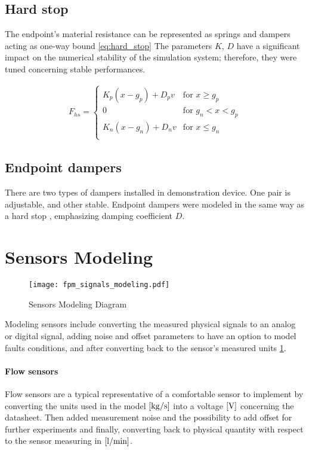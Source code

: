 \subsection{Hard stop}
The endpoint's material resistance can be represented as springs and
dampers acting as one-way bound \ref{eq:hard_stop}
The parameters $K$, $D$  have a significant impact on the numerical stability
of the simulation system; therefore, they were tuned concerning stable
performances.

\begin{align}
    F_{hs} =
    \begin{cases}
        K_p(x-g_p) + D_pv & \text{for } x \ge g_p \\
        0 & \text{for } g_n < x < g_p \\
        K_n(x-g_n) + D_nv & \text{for } x \le g_n \\
    \end{cases}
    \label{eq:hard_stop}
\end{align}


\subsection{Endpoint dampers}
There are two types of dampers installed in demonstration device. One pair
is adjustable, and other stable.  Endpoint dampers were modeled in the same
way as a hard stop \label{eq:hard_stop}, emphasizing damping coefficient
$D$. 

\section{Sensors Modeling}
\begin{figure}[h!]
    \centering
    \texttt{[image: fpm\_signals\_modeling.pdf]}
    \caption{Sensors Modeling Diagram}
    \label{fig:sig_mod_diag}
\end{figure}


Modeling sensors include converting the measured physical signals to an
analog or digital signal, adding noise and offset parameters to have an
option to model faults conditions, and after converting back to the
sensor's measured units \ref{fig:sig_mod_diag}. 

\paragraph{Flow sensors}
Flow sensors are a typical representative of a comfortable sensor to
implement by converting the units used in the model $\rm [kg/s]$ into a voltage
$\rm [V]$ concerning the datasheet. Then added measurement noise and the
possibility to add offset for further experiments and finally, converting
back to physical quantity with respect to the sensor measuring in $\rm
[l/min]$.

